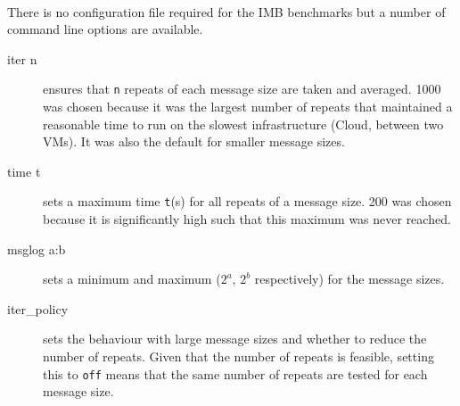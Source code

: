\documentclass{article}
\begin{document}
        \paragraph{}
        There is no configuration file required for the IMB benchmarks but a number of command line options are available.

        \begin{description}
            \item[iter n] ensures that \verb|n| repeats of each message size are taken and averaged. 1000 was chosen because it was the largest number of repeats that maintained a reasonable time to run on the slowest infrastructure (Cloud, between two VMs). It was also the default for smaller message sizes.
            \item[time t] sets a maximum time \verb|t|(s) for all repeats of a message size. 200 was chosen because it is significantly high such that this maximum was never reached.
            \item[msglog a:b] sets a minimum and maximum ($2^{a}$, $2^{b}$ respectively) for the message sizes.
            \item[iter\_policy] sets the behaviour with large message sizes and whether to reduce the number of repeats. Given that the number of repeats is feasible, setting this to \verb|off| means that the same number of repeats are tested for each message size.
        \end{description}
\end{document}
